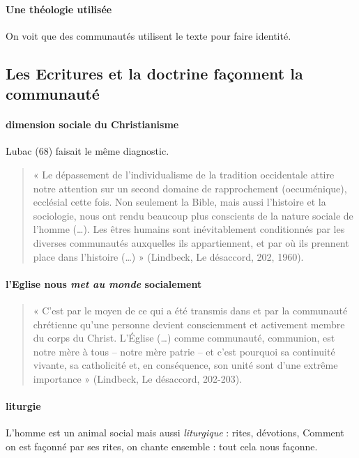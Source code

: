  \paragraph{Une théologie utilisée} On voit que des communautés utilisent le texte pour faire identité.
 
 \subsection{Les Ecritures et la doctrine façonnent la communauté}

 \paragraph{dimension sociale du Christianisme} Lubac (68) faisait le même diagnostic.

 \begin{quote}
     « Le dépassement de l’individualisme de la tradition occidentale attire notre attention sur un second
domaine de rapprochement (oecuménique), ecclésial cette fois. Non seulement la Bible, mais aussi
l’histoire et la sociologie, nous ont rendu beaucoup plus conscients de la nature sociale de l’homme
(…). Les êtres humains sont inévitablement conditionnés par les diverses communautés auxquelles ils
appartiennent, et par où ils prennent place dans l’histoire (…) » (Lindbeck, Le désaccord, 202, 1960).
 \end{quote}


 \paragraph{l'Eglise nous \textit{met au monde} socialement}
 \begin{quote}
     « C’est par le moyen de ce qui a été transmis dans et par la communauté chrétienne qu’une personne
devient consciemment et activement membre du corps du Christ. L’Église (…) comme communauté,
communion, est notre mère à tous – notre mère patrie – et c’est pourquoi sa continuité vivante, sa
catholicité et, en conséquence, son unité sont d’une extrême importance » (Lindbeck, Le désaccord,
202-203).
 \end{quote}

\paragraph{liturgie}
 L'homme est un animal social mais aussi \textit{liturgique} : rites, dévotions, Comment on est façonné par ses rites, on chante ensemble : tout cela nous façonne. 

